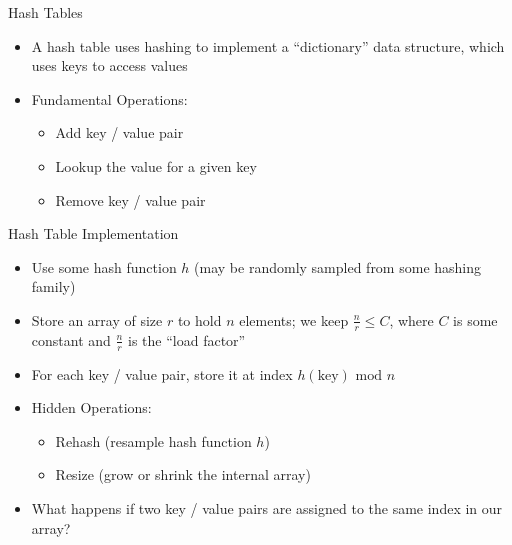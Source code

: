 \documentclass[aspectratio=169]{beamer}
\begin{document}
\begin{frame}{Hash Tables}
    \begin{itemize}
        \item A hash table uses hashing to implement a ``dictionary'' data structure, which uses keys to access values \pause
        \item Fundamental Operations:
        \begin{itemize}
            \item Add key / value pair
            \item Lookup the value for a given key
            \item Remove key / value pair
        \end{itemize}
    \end{itemize}
\end{frame}

\begin{frame}{Hash Table Implementation}
    \begin{itemize}
        \item Use some hash function $h$ (may be randomly sampled from some hashing family)
        \item Store an array of size $r$ to hold $n$ elements; we keep $\frac n r \le C$, where $C$ is some constant and $\frac n r$ is the ``load factor''
        \item For each key / value pair, store it at index $h(\text{key}) \text{ mod } n$ \pause
        \item Hidden Operations:
        \begin{itemize}
            \item Rehash (resample hash function $h$)
            \item Resize (grow or shrink the internal array)
        \end{itemize} \pause
        \item What happens if two key / value pairs are assigned to the same index in our array?
    \end{itemize}
\end{frame}
\end{document}
